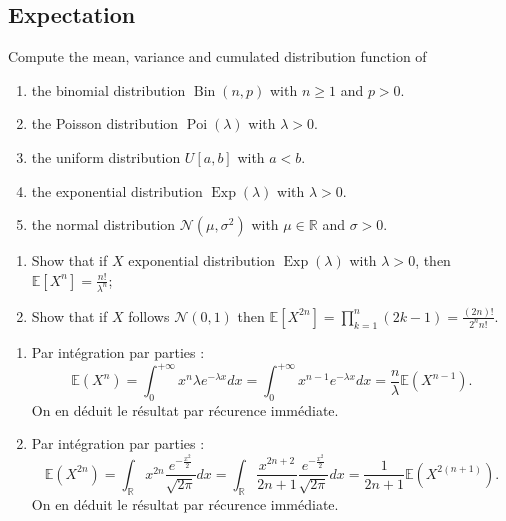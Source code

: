 \begin{center}
    \section*{Expectation}
\end{center}

\begin{Exercise}
    Compute the mean, variance and cumulated distribution function of 
\vspace*{0.2cm}

\begin{enumerate}
  \item the binomial distribution $\operatorname{Bin}(n, p)$ with $n \geq 1$ and $p>0$.

  \item the Poisson distribution $\operatorname{Poi}(\lambda)$ with $\lambda>0$.

  \item the uniform distribution $U[a, b]$ with $a<b$.

  \item the exponential distribution $\operatorname{Exp}(\lambda)$ with $\lambda>0$.

  \item the normal distribution $\mathcal{N}\left(\mu, \sigma^{2}\right)$ with $\mu \in \mathbb{R}$ and $\sigma>0$.

\end{enumerate}
\end{Exercise}

\begin{Exercise}
    \begin{enumerate}
  \item Show that if $X$ exponential distribution $\operatorname{Exp}(\lambda)$ with $\lambda>0$, then $\mathbb{E}\left[X^{n}\right]=\frac{n !}{\lambda^{n}}$;

  \item Show that if $X$ follows $\mathcal{N}(0,1)$ then $\mathbb{E}\left[X^{2 n}\right]=\prod_{k=1}^{n}(2 k-1)=\frac{(2 n) !}{2^{n} n !}$.

\end{enumerate}
\end{Exercise}

\begin{solution}
  \begin{enumerate}
      \item Par int\'{e}gration par parties :
      \[
        \mathbb{E}\left(X^{n}\right) = \int_{0}^{+\infty}x^{n}\lambda e^{-\lambda x}dx = \int_{0}^{+\infty}x^{n-1} e^{-\lambda x}dx = \frac{n}{\lambda}\mathbb{E}\left(X^{n-1}\right).
      \]
      On en d\'{e}duit le r\'{e}sultat par r\'{e}curence imm\'{e}diate.
      \item Par int\'{e}gration par parties :
      \[
        \mathbb{E}\left(X^{2n}\right) = \int_{\mathbb{R}}x^{2n}\frac{e^{-\frac{x^2}{2}}}{\sqrt{2\pi}}dx = \int_{\mathbb{R}}\frac{x^{2n+2}}{2n + 1}\frac{e^{-\frac{x^2}{2}}}{\sqrt{2\pi}}dx = \frac{1}{2n+1}\mathbb{E}\left(X^{2(n+1)}\right).
      \]
      On en d\'{e}duit le r\'{e}sultat par r\'{e}curence imm\'{e}diate.
  \end{enumerate}
\end{solution}

